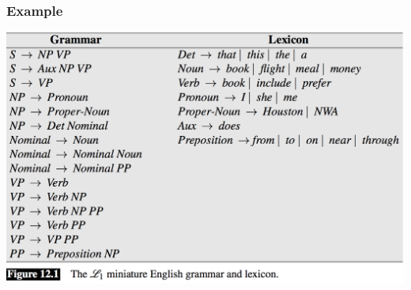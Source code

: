 \documentclass{beamer}
\begin{document}
\begin{frame}
\frametitle{Example}
\includegraphics[width=\textwidth]{figures/grammar}
\end{frame}

%
%
\end{document}
